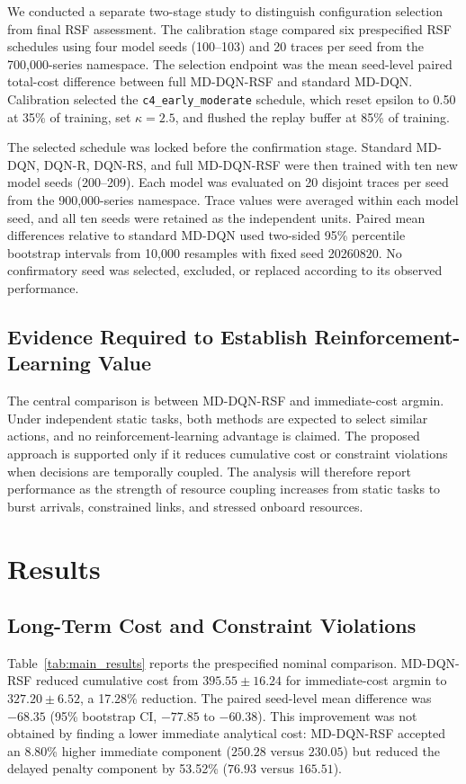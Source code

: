 \documentclass[lettersize,journal]{IEEEtran}
\begin{document}
We conducted a separate two-stage study to distinguish configuration selection from final RSF assessment. The calibration stage compared six prespecified RSF schedules using four model seeds (100--103) and 20 traces per seed from the 700,000-series namespace. The selection endpoint was the mean seed-level paired total-cost difference between full MD-DQN-RSF and standard MD-DQN. Calibration selected the \texttt{c4\_early\_moderate} schedule, which reset epsilon to 0.50 at 35\% of training, set $\kappa=2.5$, and flushed the replay buffer at 85\% of training.

The selected schedule was locked before the confirmation stage. Standard MD-DQN, DQN-R, DQN-RS, and full MD-DQN-RSF were then trained with ten new model seeds (200--209). Each model was evaluated on 20 disjoint traces per seed from the 900,000-series namespace. Trace values were averaged within each model seed, and all ten seeds were retained as the independent units. Paired mean differences relative to standard MD-DQN used two-sided 95\% percentile bootstrap intervals from 10,000 resamples with fixed seed 20260820. No confirmatory seed was selected, excluded, or replaced according to its observed performance.

\subsection{Evidence Required to Establish Reinforcement-Learning Value}

The central comparison is between MD-DQN-RSF and immediate-cost argmin. Under independent static tasks, both methods are expected to select similar actions, and no reinforcement-learning advantage is claimed. The proposed approach is supported only if it reduces cumulative cost or constraint violations when decisions are temporally coupled. The analysis will therefore report performance as the strength of resource coupling increases from static tasks to burst arrivals, constrained links, and stressed onboard resources.

\section{Results}
\label{sec:results}

\subsection{Long-Term Cost and Constraint Violations}

Table~\ref{tab:main_results} reports the prespecified nominal comparison. MD-DQN-RSF reduced cumulative cost from $395.55\pm16.24$ for immediate-cost argmin to $327.20\pm6.52$, a 17.28\% reduction. The paired seed-level mean difference was $-68.35$ (95\% bootstrap CI, $-77.85$ to $-60.38$). This improvement was not obtained by finding a lower immediate analytical cost: MD-DQN-RSF accepted an 8.80\% higher immediate component ($250.28$ versus $230.05$) but reduced the delayed penalty component by 53.52\% ($76.93$ versus $165.51$).
\end{document}
